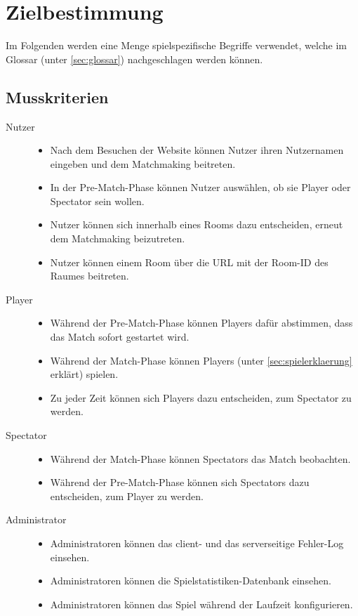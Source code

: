 \section{Zielbestimmung}

\newcommand{\crit}[2]{
	\item[#1] \hfill
		\begin{itemize}
			#2
		\end{itemize}
}

Im Folgenden werden eine Menge spielspezifische Begriffe verwendet, welche im Glossar (unter \ref{sec:glossar}) nachgeschlagen werden können.

\subsection{Musskriterien}
\begin{description}
	\crit{Nutzer}{
		\item Nach dem Besuchen der Website können Nutzer ihren Nutzernamen eingeben und dem Matchmaking beitreten.
		\item In der Pre-Match-Phase können Nutzer auswählen, ob sie Player oder Spectator sein wollen.
		\item Nutzer können sich innerhalb eines Rooms dazu entscheiden, erneut dem Matchmaking beizutreten.
		\item Nutzer können einem Room über die URL mit der Room-ID des Raumes beitreten.
	}
	\crit{Player}{
		\item Während der Pre-Match-Phase können Players dafür abstimmen, dass das Match sofort gestartet wird.
		\item Während der Match-Phase können Players \vires (unter \ref{sec:spielerklaerung} erklärt) spielen.
		\item Zu jeder Zeit können sich Players dazu entscheiden, zum Spectator zu werden.
	}
	\crit{Spectator}{
		\item Während der Match-Phase können Spectators das Match beobachten.
		\item Während der Pre-Match-Phase können sich Spectators dazu entscheiden, zum Player zu werden.
	}
	\crit{Administrator}{
		\item Administratoren können das client- und das serverseitige Fehler-Log einsehen.
		\item Administratoren können die Spielstatistiken-Datenbank einsehen.
		\item Administratoren können das Spiel während der Laufzeit konfigurieren.
	}
\end{description}

